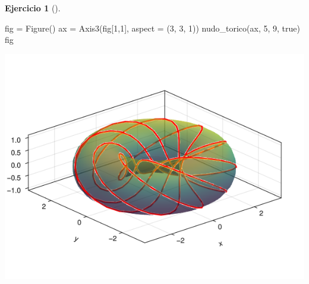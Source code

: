 \documentclass[
  a4paper,
]{scrreport}
\newenvironment{Shaded}{\begin{snugshade}}{\end{snugshade}}
\newcommand{\ConstantTok}[1]{\textcolor[rgb]{0.56,0.35,0.01}{#1}}
\newcommand{\FloatTok}[1]{\textcolor[rgb]{0.68,0.00,0.00}{#1}}
\newcommand{\FunctionTok}[1]{\textcolor[rgb]{0.28,0.35,0.67}{#1}}
\newcommand{\NormalTok}[1]{\textcolor[rgb]{0.00,0.23,0.31}{#1}}
\newcommand{\OperatorTok}[1]{\textcolor[rgb]{0.37,0.37,0.37}{#1}}
\theoremstyle{definition}
\newtheorem{exercise}{Ejercicio}[chapter]
\theoremstyle{remark}
\begin{document}
\begin{exercise}[]
\begin{enumerate}
\begin{tcolorbox}
\begin{Shaded}
\begin{Highlighting}[]
\NormalTok{fig }\OperatorTok{=} \FunctionTok{Figure}\NormalTok{()}
\NormalTok{ax }\OperatorTok{=} \FunctionTok{Axis3}\NormalTok{(fig[}\FloatTok{1}\NormalTok{,}\FloatTok{1}\NormalTok{], aspect }\OperatorTok{=}\NormalTok{ (}\FloatTok{3}\NormalTok{, }\FloatTok{3}\NormalTok{, }\FloatTok{1}\NormalTok{))}
\FunctionTok{nudo\_torico}\NormalTok{(ax, }\FloatTok{5}\NormalTok{, }\FloatTok{9}\NormalTok{, }\ConstantTok{true}\NormalTok{)}
\NormalTok{fig}
\end{Highlighting}
\end{Shaded}

  \includegraphics{08-funciones-vectoriales_files/figure-pdf/cell-14-output-1.png}

  \end{tcolorbox}
\end{enumerate}

\end{exercise}
\end{document}
